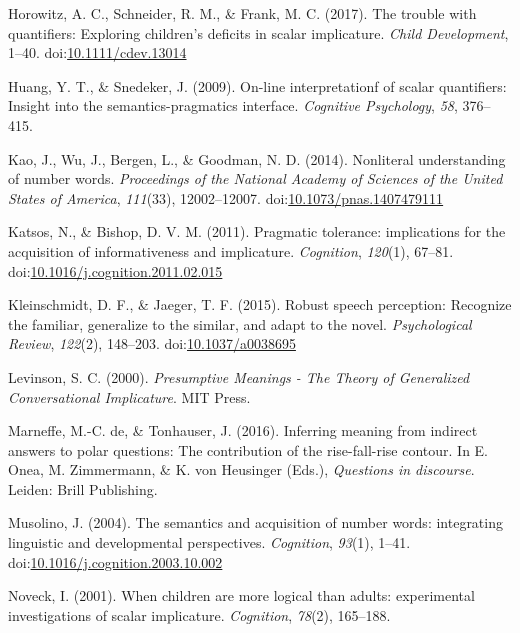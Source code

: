 \documentclass[man]{apa6}
\theoremstyle{definition}
\theoremstyle{definition}
\theoremstyle{definition}
\theoremstyle{remark}
\begin{document}
\hypertarget{ref-Horowitz2017}{}
Horowitz, A. C., Schneider, R. M., \& Frank, M. C. (2017). The trouble
with quantifiers: Exploring children's deficits in scalar implicature.
\emph{Child Development}, 1--40.
doi:\href{https://doi.org/10.1111/cdev.13014}{10.1111/cdev.13014}

\hypertarget{ref-huang2009}{}
Huang, Y. T., \& Snedeker, J. (2009). On-line interpretationf of scalar
quantifiers: Insight into the semantics-pragmatics interface.
\emph{Cognitive Psychology}, \emph{58}, 376--415.

\hypertarget{ref-Kao2014}{}
Kao, J., Wu, J., Bergen, L., \& Goodman, N. D. (2014). Nonliteral
understanding of number words. \emph{Proceedings of the National Academy
of Sciences of the United States of America}, \emph{111}(33),
12002--12007.
doi:\href{https://doi.org/10.1073/pnas.1407479111}{10.1073/pnas.1407479111}

\hypertarget{ref-Katsos2011}{}
Katsos, N., \& Bishop, D. V. M. (2011). Pragmatic tolerance:
implications for the acquisition of informativeness and implicature.
\emph{Cognition}, \emph{120}(1), 67--81.
doi:\href{https://doi.org/10.1016/j.cognition.2011.02.015}{10.1016/j.cognition.2011.02.015}

\hypertarget{ref-Kleinschmidt2015}{}
Kleinschmidt, D. F., \& Jaeger, T. F. (2015). Robust speech perception:
Recognize the familiar, generalize to the similar, and adapt to the
novel. \emph{Psychological Review}, \emph{122}(2), 148--203.
doi:\href{https://doi.org/10.1037/a0038695}{10.1037/a0038695}

\hypertarget{ref-levinson2000}{}
Levinson, S. C. (2000). \emph{Presumptive Meanings - The Theory of
Generalized Conversational Implicature}. MIT Press.

\hypertarget{ref-DeMarneffe2017}{}
Marneffe, M.-C. de, \& Tonhauser, J. (2016). Inferring meaning from
indirect answers to polar questions: The contribution of the
rise-fall-rise contour. In E. Onea, M. Zimmermann, \& K. von Heusinger
(Eds.), \emph{Questions in discourse}. Leiden: Brill Publishing.

\hypertarget{ref-Musolino2004}{}
Musolino, J. (2004). The semantics and acquisition of number words:
integrating linguistic and developmental perspectives. \emph{Cognition},
\emph{93}(1), 1--41.
doi:\href{https://doi.org/10.1016/j.cognition.2003.10.002}{10.1016/j.cognition.2003.10.002}

\hypertarget{ref-Noveck2001}{}
Noveck, I. (2001). When children are more logical than adults:
experimental investigations of scalar implicature. \emph{Cognition},
\emph{78}(2), 165--188.
\end{document}

